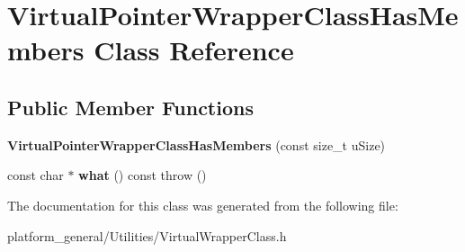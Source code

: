\hypertarget{classVirtualPointerWrapperClassHasMembers}{\section{\-Virtual\-Pointer\-Wrapper\-Class\-Has\-Members \-Class \-Reference}
\label{classVirtualPointerWrapperClassHasMembers}
}
\subsection*{\-Public \-Member \-Functions}
\begin{DoxyCompactItemize}
\item 
\hypertarget{classVirtualPointerWrapperClassHasMembers_a66e8975038be2589968c65a042bfc8f4}{{\bfseries \-Virtual\-Pointer\-Wrapper\-Class\-Has\-Members} (const size\-\_\-t u\-Size)}\label{classVirtualPointerWrapperClassHasMembers_a66e8975038be2589968c65a042bfc8f4}

\item 
\hypertarget{classVirtualPointerWrapperClassHasMembers_a4031ce6e28066744ec216ff6c5b67997}{const char $\ast$ {\bfseries what} () const   throw ()}\label{classVirtualPointerWrapperClassHasMembers_a4031ce6e28066744ec216ff6c5b67997}

\end{DoxyCompactItemize}


\-The documentation for this class was generated from the following file\-:\begin{DoxyCompactItemize}
\item 
platform\-\_\-general/\-Utilities/\-Virtual\-Wrapper\-Class.\-h\end{DoxyCompactItemize}
